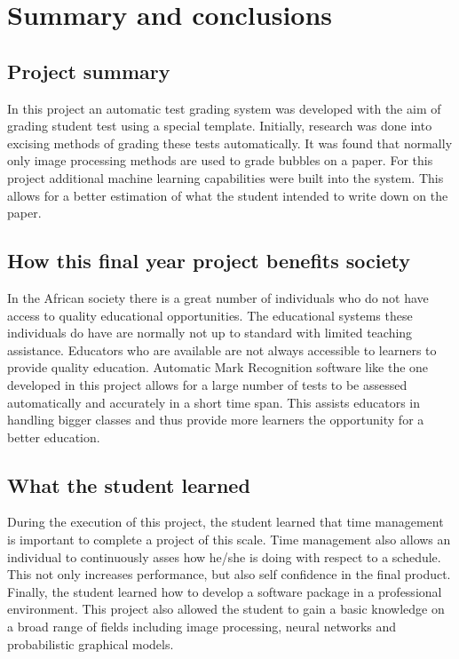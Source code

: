 \def\baselinestretch{1}
\chapter{Summary and conclusions}
\label{ch:Conclusions}

\graphicspath{{Conclusions/Figures_Conclusions/}}
\section{Project summary}
In this project an automatic test grading system was developed with the aim of grading student test using a special template. Initially, research was done into excising methods of grading these tests automatically. It was found that normally only image processing methods are used to grade bubbles on a paper. For this project additional machine learning capabilities were built into the system. This allows for a better estimation of what the student  intended to write down on the paper.

\section{How this final year project benefits society}
In the African society there is a great number of individuals who do not have access to quality educational opportunities. The educational systems these individuals do have are normally not up to standard with limited teaching assistance. Educators who are available are not always accessible to learners to provide quality education. Automatic Mark Recognition software like the one developed in this project allows for a large number of tests to be assessed automatically and accurately in a short time span. This assists educators in handling bigger classes and thus provide more learners the opportunity for a better education.

\section{What the student learned}
During the execution of this project, the student learned that time management is important to complete a project of this scale. Time management also allows an individual to continuously asses how he/she is doing with respect to a schedule. This not only increases performance, but also self confidence in the final product. Finally, the student learned how to develop a software package in a professional environment. This project also allowed the student to gain a basic knowledge on a broad range of fields including image processing, neural networks and probabilistic graphical models. 


